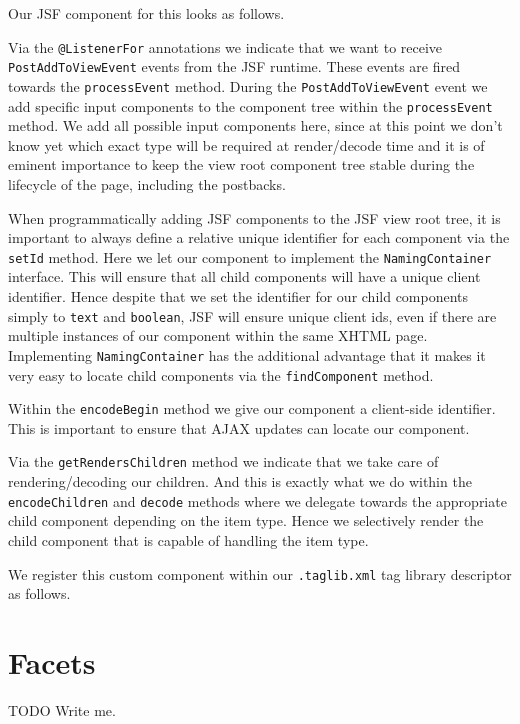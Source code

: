 Our JSF component for this looks as follows.

Via the \texttt{@ListenerFor} annotations we indicate that we want to receive \texttt{PostAddToView\allowbreak Event} events from the JSF runtime.
These events are fired towards the \texttt{processEvent} method.
During the \texttt{PostAddToViewEvent} event we add specific input components to the component tree within the \texttt{processEvent} method.
We add all possible input components here,  since at this point we don't know yet which exact type will be required at render/decode time and it is of eminent importance to keep the view root component tree stable during the lifecycle of the page, including the postbacks.

When programmatically adding JSF components to the JSF view root tree, it is important to always define a relative unique identifier for each component via the \texttt{setId} method.
Here we let our component to implement the \texttt{NamingContainer} interface.
This will ensure that all child components will have a unique client identifier.
Hence despite that we set the identifier for our child components simply to \texttt{text} and \texttt{boolean}, JSF will ensure unique client ids, even if there are multiple instances of our component within the same XHTML page.
Implementing \texttt{NamingContainer} has the additional advantage that it makes it very easy to locate child components via the \texttt{findComponent} method.

Within the \texttt{encodeBegin} method we give our component a client-side identifier.
This is important to ensure that AJAX updates can locate our component.

Via the \texttt{getRendersChildren} method we indicate that we take care of rendering/decoding our children.
And this is exactly what we do within the \texttt{encodeChildren} and \texttt{decode} methods where we delegate towards the appropriate child component depending on the item type.
Hence we selectively render the child component that is capable of handling the item type.

We register this custom component within our \texttt{.taglib.xml} tag library descriptor as follows.


\section{Facets}
\begin{TODO}{TODO}
	Write me.
\end{TODO}


